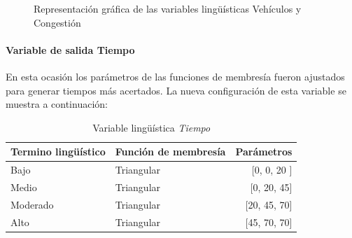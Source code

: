 \begin{figure}[H]
	\centering
	\caption[Gráficas de las variables lingüísticas vehículos y congestión]{Representación gráfica de las variables lingüísticas Vehículos y Congestión }
\end{figure}

\pagebreak
\paragraph{Variable de salida Tiempo}
En esta ocasión los parámetros de las funciones de membresía fueron ajustados para generar tiempos más acertados. La nueva configuración de esta variable se muestra a continuación:


\begin{table}[!h]
	\centering
	\begin{tabular}{llr} \toprule
		Termino lingüístico & Función de membresía & Parámetros \\ \midrule
		Bajo & Triangular & [0, 0, 20 ] \\
		Medio & Triangular & [0, 20, 45] \\
		Moderado & Triangular & [20, 45, 70] \\
		Alto & Triangular & [45, 70, 70] \\ \bottomrule
	\end{tabular}
	\caption{Variable lingüística \textit{Tiempo}}
\end{table}

